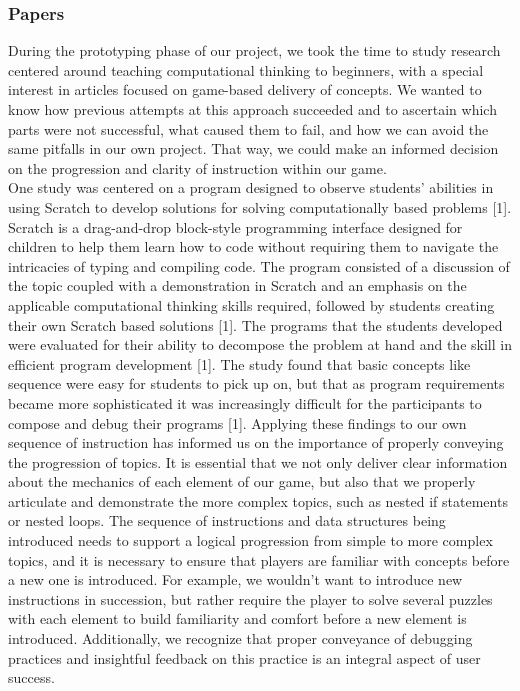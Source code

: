 \subsubsection{Papers}
During the prototyping phase of our project, we took the time to study research
centered around teaching computational thinking to beginners, with a special
interest in articles focused on game-based delivery of concepts. We wanted to
know how previous attempts at this approach succeeded and to ascertain which
parts were not successful, what caused them to fail, and how we can avoid the
same pitfalls in our own project. That way, we could make an informed decision
on the progression and clarity of instruction within our game.\\

One study was centered on a program designed to observe students’ abilities in
using Scratch to develop solutions for solving computationally based problems
[1]. Scratch is a drag-and-drop block-style programming interface designed for
children to help them learn how to code without requiring them to navigate the
intricacies of typing and compiling code. The program consisted of a discussion
of the topic coupled with a demonstration in Scratch and an emphasis on the
applicable computational thinking skills required, followed by students creating
their own Scratch based solutions [1]. The programs that the students developed
were evaluated for their ability to decompose the problem at hand and the skill
in efficient program development [1]. The study found that basic concepts like
sequence were easy for students to pick up on, but that as program requirements
became more sophisticated it was increasingly difficult for the participants to
compose and debug their programs [1]. Applying these findings to our own
sequence of instruction has informed us on the importance of properly conveying
the progression of topics. It is essential that we not only deliver clear
information about the mechanics of each element of our game, but also that we
properly articulate and demonstrate the more complex topics, such as nested if
statements or nested loops. The sequence of instructions and data structures
being introduced needs to support a logical progression from simple to more
complex topics, and it is necessary to ensure that players are familiar with
concepts before a new one is introduced. For example, we wouldn’t want to
introduce new instructions in succession, but rather require the player to solve
several puzzles with each element to build familiarity and comfort before a new
element is introduced.  Additionally, we recognize that proper conveyance of
debugging practices and insightful feedback on this practice is an integral
aspect of user success.\\

